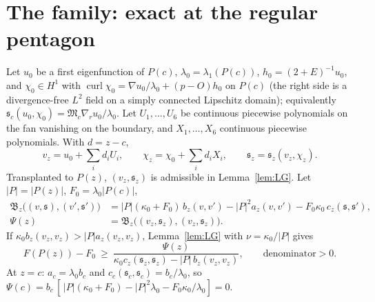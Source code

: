 \documentclass[11pt]{article}
\theoremstyle{remark}
\newcommand{\M}{\mathfrak{M}}
\newcommand{\s}{\mathfrak{s}}
\newcommand{\B}{\mathfrak{B}}
\newcommand{\gr}{\nabla_{\!r}}
\DeclareMathOperator{\curl}{curl}
\begin{document}
\section{The family: exact at the regular pentagon}\label{sec:family}
Let $u_0$ be a first eigenfunction of $P(c)$, $\lambda_0=\lambda_1(P(c))$, $h_0=(2+E)^{-1}u_0$, and $\chi_0\in H^1$
with $\curl\chi_0=\nabla u_0/\lambda_0+(p-O)h_0$ on $P(c)$ (the right side is a divergence-free $L^2$ field on a
simply connected Lipschitz domain); equivalently $\s_c(u_0,\chi_0)=\M_c\gr u_0/\lambda_0$. Let $U_1,\dots,U_6$ be
continuous piecewise polynomials on the fan vanishing on the boundary, and $X_1,\dots,X_6$ continuous piecewise
polynomials. With $d=z-c$,
\[
v_z=u_0+\sum_id_iU_i,\qquad\chi_z=\chi_0+\sum_id_iX_i,\qquad\s_z=\s_z(v_z,\chi_z).
\]
Transplanted to $P(z)$, $(v_z,\s_z)$ is admissible in Lemma~\ref{lem:LG}. Let $|P|=|P(z)|$, $F_0=\lambda_0|P(c)|$,
\begin{align*}
\B_z\big((v,\s),(v',\s')\big)&=|P|(\kappa_0+F_0)\,b_z(v,v')-|P|^2a_z(v,v')-F_0\kappa_0\,c_z(\s,\s'),\\
\Psi(z)&=\B_z\big((v_z,\s_z),(v_z,\s_z)\big).
\end{align*}
If $\kappa_0b_z(v_z,v_z)>|P|a_z(v_z,v_z)$, Lemma~\ref{lem:LG} with $\nu=\kappa_0/|P|$ gives
\begin{equation}\label{eq:main}
F(P(z))-F_0\ \ge\ \frac{\Psi(z)}{\kappa_0c_z(\s_z,\s_z)-|P|\,b_z(v_z,v_z)},\qquad\text{denominator}>0 .
\end{equation}
At $z=c$: $a_c=\lambda_0b_c$ and $c_c(\s_c,\s_c)=b_c/\lambda_0$, so $\Psi(c)=b_c\,[\,|P|(\kappa_0+F_0)-|P|^2\lambda_0-
F_0\kappa_0/\lambda_0]=0$.
\end{document}
